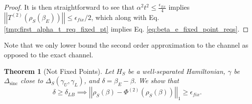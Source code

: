 \documentclass{article}
\newtheorem{theorem}{Theorem}
\newcommand{\norm}[1]{\left| \left| #1 \right| \right|}
\DeclareMathOperator{\sinc}{sinc}
\begin{document}
\begin{proof}
    It is then straightforward to see that $\alpha^2 t^2 \leq \frac{\epsilon_{fix}}{4}$ implies $\norm{T^{(2)}(\rho_S(\beta_E))} \leq \epsilon_{fix} / 2$, which along with Eq. \eqref{tmp:first_alpha_t_req_fixed_pt} implies Eq. \eqref{eq:beta_e_fixed_point_reqs}. 
\end{proof}

Note that we only lower bound the second order approximation to the channel as opposed to the exact channel.
\begin{theorem}[Not Fixed Points] \label{thm:which_beta_not_fixed}
    Let $H_S$ be a well-separated Hamiltonian, $\gamma$ be $\Delta_{\sinc}$ close to $\Delta_S(\gamma_U, \gamma_L)$, and $\delta = \beta_E - \beta$. We show that
    \begin{equation}
        \delta \geq \delta_{LB} \implies \norm{\rho_S(\beta) - \Phi^{(2)}(\rho_S(\beta))}_1 \geq \epsilon_{fix}.
    \end{equation}
\end{theorem}
\end{document}
